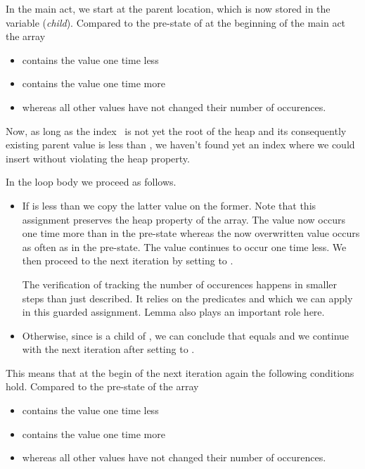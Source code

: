 In the main act, we start at the parent location, which is now stored
in the variable  (\emph{child}).
Compared to the pre-state of \pushheap
at the beginning of the main act the array  
\begin{itemize}
\item contains the value  one time less
\item contains the value  one time more
\item whereas all other values have not changed their number of occurences.
\end{itemize}

Now, as long as the index~ is not yet the root of the heap
and its consequently existing parent value  is less than ,
we haven't found yet an index  where we could insert  without
violating the heap property.

In the loop body we proceed as follows.

\begin{itemize}
\item
If  is less than  we copy the latter value on the former.
Note that this assignment preserves the heap property of the array.
The value  now occurs one time more than in the pre-state whereas
the now overwritten value  occurs as often as in the pre-state.
The value  continues to occur one time less.
%
We then proceed to the next iteration by setting  to .

The verification of tracking the number of occurences happens
in smaller steps than just described.
It relies on the predicates  and 
which we can apply in this guarded assignment.
Lemma  also plays an important role here.

\item
Otherwise, since  is a child of ,  we can conclude that
 equals  and we continue with the next iteration
after setting  to .
\end{itemize}

This means that at the begin of the next iteration again
the following conditions hold.
Compared to the pre-state of \pushheap the array  

\begin{itemize}
\item contains the value  one time less
\item contains the value  one time more
\item whereas all other values have not changed their number of occurences.
\end{itemize}


